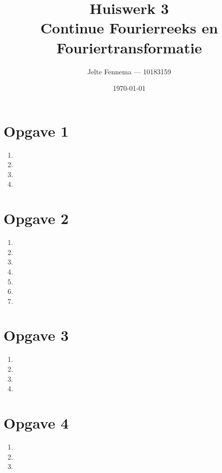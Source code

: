 \documentclass{article}
\title{Huiswerk 3\\ Continue Fourierreeks en Fouriertransformatie}
\author{Jelte Fennema --- 10183159}
\date{\today}
\begin{document}
\maketitle
    \section*{Opgave 1}
        \begin{enumerate}
            \item
            \item
            \item
            \item
        \end{enumerate}

    \section*{Opgave 2}
        \begin{enumerate}
            \item
            \item
            \item
            \item
            \item
            \item
            \item
        \end{enumerate}

    \section*{Opgave 3}
        \begin{enumerate}
            \item
            \item
            \item
            \item
        \end{enumerate}

    \section*{Opgave 4}
        \begin{enumerate}
            \item
            \item
            \item
        \end{enumerate}
\end{document}
